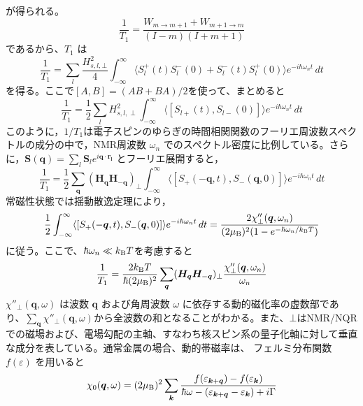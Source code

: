 \documentclass[11pt,a4j]{jreport}
\begin{document}
が得られる。
\begin{equation}
  \frac{1}{T_1}=\frac{W_{m \rightarrow m+1}+W_{m+1\rightarrow m}}{(I-m)(I+m+1)}
\end{equation}
であるから、$T_1$ は
\begin{equation}
  \frac{1}{T_1} = \sum_{l}\frac{H^2_{s,l,\bot}}{4}\int_{-\infty}^{\infty} \langle S_l^+(t) S_l^-(0) + S_l^-(t) S_l^+(0) \rangle e^{-i \hbar \omega_n t} \,dt
\end{equation}
を得る。ここで$[A,B]=(AB+BA)/2$を使って、まとめると
\begin{equation}
  \frac{1}{T_1} = \frac{1}{2} \sum_l H_{s,l, \perp}^2 \int_{-\infty}^{\infty} \langle [S_{l+}(t), S_{l-}(0)] \rangle e^{-i \hbar \omega_n t} \, dt
\end{equation}
このように，$1/T_1$は電子スピンのゆらぎの時間相関関数のフーリエ周波数スペクトルの成分の中で，NMR周波数 $\omega_n$ でのスペクトル密度に比例している。さらに，$ \bm{S}(\bm q) = \sum_l \bm{S}_l e^{i \bm q \cdot \bm {r_l}}$ とフーリエ展開すると，
\begin{equation}
\frac{1}{T_1} = \frac{1}{2} \sum_{\bm q} (\bm H_{\bm q} \bm H_{-\bm {q}})_{\perp} \int_{-\infty}^{\infty} \langle [S_+(-\bm {q}, t), S_-(\bm {q}, 0)] \rangle e^{-i \hbar \omega_n t} \, dt
\end{equation}
常磁性状態では揺動散逸定理により，
\begin{equation}
  \frac{1}{2} \int_{-\infty}^{\infty} \langle [S_+(-\bm {q}, t), S_-(\bm q, 0)] \rangle e^{-i \hbar \omega_n t} \, dt = \frac{2 \chi''_{\perp}(\bm q, \omega_n)}{(2\mu_{\text B})^2(1 - e^{-\hbar \omega_n / k_{\text B} T})}
\end{equation}
に従う。ここで、$\hbar\omega_n\ll k_{\text B}T$を考慮すると
\begin{equation}
\frac{1}{T_1} = \frac{2 k_{\text B} T}{\hbar (2 \mu_{\text B})^2} \sum_{\bm q} (\bm H_{\bm q} \bm H_{-\bm {q}})_{\perp} \frac{\chi''_{\perp}(\bm q, \omega_n)}{\omega_n}
\label{T1_a}
\end{equation}
$ \chi''_{\perp}(\bm q, \omega) $ は波数 $ \bm q $ および角周波数 $ \omega $ に依存する動的磁化率の虚数部であり、$\sum _{\bm q}\chi''_{\perp}(\bm q, \omega)$から全波数の和となることがわかる。また、$\bot$はNMR/NQRでの磁場および、電場勾配の主軸、すなわち核スピン系の量子化軸に対して垂直な成分を表している。通常金属の場合、動的帯磁率は、
フェルミ分布関数 $ f(\varepsilon) $ を用いると
\begin{equation}
\chi_0(\bm q, \omega) = (2\mu_{\text B})^2 \sum_{\bm k} \frac{f(\varepsilon_{\bm k+\bm q}) - f(\varepsilon_{\bm k})}{\hbar \omega - (\varepsilon_{\bm k+\bm q} - \varepsilon_{\bm k}) + i \Gamma}
\end{equation}
\end{document}
